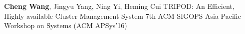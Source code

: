 \cvpub
{\textbf{Cheng Wang}, Jingyu Yang, Ning Yi, Heming Cui} %
{TRIPOD: An Efficient, Highly-available Cluster Management System} %
{} %
{} %
{ %
7th ACM SIGOPS Asia-Pacific Workshop on Systems (ACM APSys'16)
}
